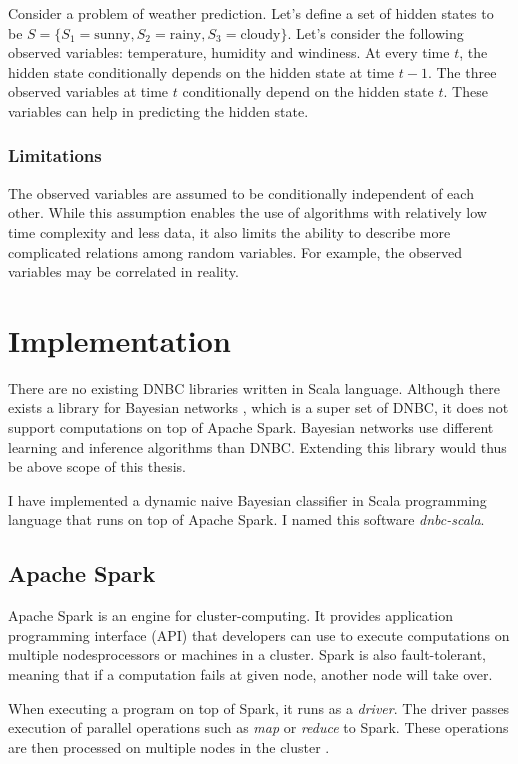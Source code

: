 \documentclass[thesis=B,english]{FITthesis}[2012/06/26]
\begin{document}
Consider a problem of weather prediction. Let's define a set of hidden states to be $S = \{S_1 = \text{sunny}, S_2 = \text{rainy}, S_3 = \text{cloudy} \}$. Let's consider the following observed variables: temperature, humidity and windiness. At every time $t$, the hidden state conditionally depends on the hidden state at time $t-1$. The three observed variables at time $t$ conditionally depend on the hidden state $t$. These variables can help in predicting the hidden state.

\subsection{Limitations}

The observed variables are assumed to be conditionally independent of each other. While this assumption enables the use of algorithms with relatively low time complexity and less data, it also limits the ability to describe more complicated relations among random variables. For example, the observed variables may be correlated in reality.

\chapter{Implementation} \label{ch:implementation}

There are no existing DNBC libraries written in Scala language. Although there exists a library for Bayesian networks \cite{bayesian-networks}, which is a super set of DNBC, it does not support computations on top of Apache Spark. Bayesian networks use different learning and inference algorithms than DNBC. Extending this library would thus be above scope of this thesis.

I have implemented a dynamic naive Bayesian classifier in Scala programming language that runs on top of Apache Spark. I named this software \textit{dnbc-scala}.

\section{Apache Spark}

Apache Spark is an engine for cluster-computing. It provides application programming interface (API) that developers can use to execute computations on multiple nodes\textemdash processors or machines in a cluster. Spark is also fault-tolerant, meaning that if a computation fails at given node, another node will take over.

When executing a program on top of Spark, it runs as a \textit{driver}. The driver passes execution of parallel operations such as \textit{map} or \textit{reduce} to Spark. These operations are then processed on multiple nodes in the cluster \cite{spark}.
\end{document}
